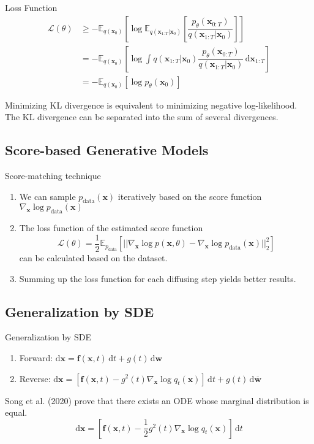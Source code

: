 \begin{frame}{Loss Function}
\begin{align*}
   \mathcal{L}(\theta)&\ge-\mathbb{E}_{q(\mathbf{x}_0)}\left[\log\mathbb{E}_{q(\mathbf{x}_{1:T}|\mathbf{x}_0)}\left[\dfrac{p_\theta(\mathbf{x}_{0:T})}{q(\mathbf{x}_{1:T}|\mathbf{x}_0)}\right]\right]\\
   &=-\mathbb{E}_{q(\mathbf{x}_0)}\left[\log\int q(\mathbf{x}_{1:T}|\mathbf{x}_0)\dfrac{p_\theta(\mathbf{x}_{0:T})}{q(\mathbf{x}_{1:T}|\mathbf{x}_0)}\,\mathrm{d}\mathbf{x}_{1:T} \right]\\
   &=-\mathbb{E}_{q(\mathbf{x}_0)}\left[\log p_\theta(\mathbf{x}_{0})\right]
\end{align*}

Minimizing KL divergence is equivalent to minimizing negative log-likelihood. The KL divergence can be separated into the sum of several divergences.
\end{frame}


\subsection{Score-based Generative Models}
\begin{frame}{Score-matching technique}
    \begin{enumerate}
        \item We can sample $p_{\text{data}}(\mathbf{x})$ iteratively based on the score function $\nabla_\mathbf{x}\log p_{\text{data}}(\mathbf{x})$
        \item The loss function of the estimated score function 
        $$\mathcal{L}(\theta)=\dfrac{1}{2}\mathbb{E}_{p_{\text{data}}}[||\nabla_\mathbf{x}\log p(\mathbf{x},\theta)-\nabla_\mathbf{x}\log p_{\text{data}}(\mathbf{x})||^2_2]$$
        can be calculated based on the dataset.
        \item Summing up the loss function for each diffusing step yields better results.
    \end{enumerate}
\end{frame}

\subsection{Generalization by SDE}

\begin{frame}{Generalization by SDE}
    \begin{enumerate}
        \item Forward: $\mathrm{d}\mathbf{x}=\mathbf{f}(\mathbf{x},t)\,\mathrm{d}t+g(t)\,\mathrm{d}\mathbf{w}$
        \item Reverse: $\mathrm{d}\mathbf{x}=[\mathbf{f}(\mathbf{x},t)-g^2(t)\nabla_\mathbf{x}\log q_t(\mathbf{x})]\,\mathrm{d}t+g(t)\,\mathrm{d}\overline{\mathbf{w}}$
    \end{enumerate}
    Song et al. (2020) prove that there exists an ODE whose marginal distribution is equal.
    $$\mathrm{d}\mathbf{x}=[\mathbf{f}(\mathbf{x},t)-\dfrac{1}{2}g^2(t)\nabla_\mathbf{x}\log q_t(\mathbf{x})]\,\mathrm{d}t$$
\end{frame}